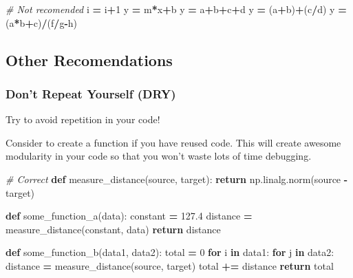 \documentclass[
]{book}
\newenvironment{Shaded}{\begin{snugshade}}{\end{snugshade}}
\newcommand{\CommentTok}[1]{\textcolor[rgb]{0.56,0.35,0.01}{\textit{#1}}}
\newcommand{\ControlFlowTok}[1]{\textcolor[rgb]{0.13,0.29,0.53}{\textbf{#1}}}
\newcommand{\DecValTok}[1]{\textcolor[rgb]{0.00,0.00,0.81}{#1}}
\newcommand{\FloatTok}[1]{\textcolor[rgb]{0.00,0.00,0.81}{#1}}
\newcommand{\KeywordTok}[1]{\textcolor[rgb]{0.13,0.29,0.53}{\textbf{#1}}}
\newcommand{\NormalTok}[1]{#1}
\newcommand{\OperatorTok}[1]{\textcolor[rgb]{0.81,0.36,0.00}{\textbf{#1}}}
\begin{document}
\begin{Shaded}
\begin{Highlighting}[]
\CommentTok{\# Not recomended }
\NormalTok{i }\OperatorTok{=}\NormalTok{ i}\OperatorTok{+}\DecValTok{1}
\NormalTok{y }\OperatorTok{=}\NormalTok{ m}\OperatorTok{*}\NormalTok{x}\OperatorTok{+}\NormalTok{b}
\NormalTok{y }\OperatorTok{=}\NormalTok{ a}\OperatorTok{+}\NormalTok{b}\OperatorTok{+}\NormalTok{c}\OperatorTok{+}\NormalTok{d}
\NormalTok{y }\OperatorTok{=}\NormalTok{ (a}\OperatorTok{+}\NormalTok{b)}\OperatorTok{+}\NormalTok{(c}\OperatorTok{/}\NormalTok{d)}
\NormalTok{y }\OperatorTok{=}\NormalTok{ (a}\OperatorTok{*}\NormalTok{b}\OperatorTok{+}\NormalTok{c)}\OperatorTok{/}\NormalTok{(f}\OperatorTok{/}\NormalTok{g}\OperatorTok{{-}}\NormalTok{h)}
\end{Highlighting}
\end{Shaded}

\hypertarget{other-recomendations}{%
\subsection{Other Recomendations}\label{other-recomendations}}

\hypertarget{dont-repeat-yourself-dry}{%
\subsubsection{Don't Repeat Yourself (DRY)}\label{dont-repeat-yourself-dry}}

Try to avoid repetition in your code!

Consider to create a function if you have reused code. This will create awesome modularity in your code so that you won't waste lots of time debugging.

\begin{Shaded}
\begin{Highlighting}[]
\CommentTok{\# Correct }
\KeywordTok{def}\NormalTok{ measure\_distance(source, target):}
    \ControlFlowTok{return}\NormalTok{ np.linalg.norm(source }\OperatorTok{{-}}\NormalTok{ target)}

\KeywordTok{def}\NormalTok{ some\_function\_a(data):}
\NormalTok{    constant }\OperatorTok{=} \FloatTok{127.4}
\NormalTok{    distance }\OperatorTok{=}\NormalTok{ measure\_distance(constant, data)}
    \ControlFlowTok{return}\NormalTok{ distance}

\KeywordTok{def}\NormalTok{ some\_function\_b(data1, data2):}
\NormalTok{    total }\OperatorTok{=} \DecValTok{0}
    \ControlFlowTok{for}\NormalTok{ i }\KeywordTok{in}\NormalTok{ data1:}
        \ControlFlowTok{for}\NormalTok{ j }\KeywordTok{in}\NormalTok{ data2:}
\NormalTok{            distance }\OperatorTok{=}\NormalTok{ measure\_distance(source, target)}
\NormalTok{            total }\OperatorTok{+=}\NormalTok{ distance}
    \ControlFlowTok{return}\NormalTok{ total}
\end{Highlighting}
\end{Shaded}
\end{document}
